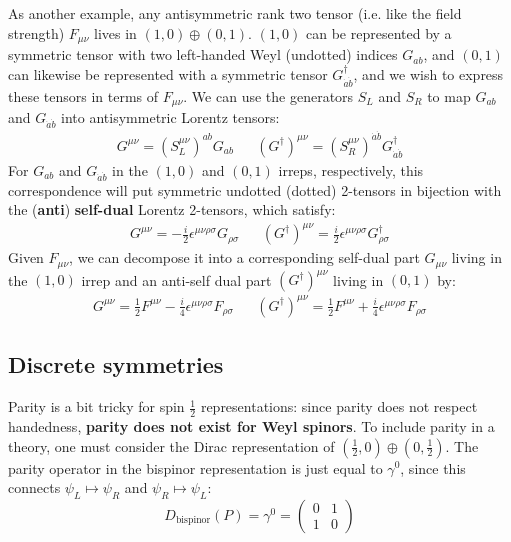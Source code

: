 \documentclass[11pt, oneside]{article}   	%
\theoremstyle{definition}
\begin{document}
As another example, any antisymmetric rank two tensor (i.e. like the field strength) $F_{\mu\nu}$ lives in $(1, 0)\oplus (0, 1)$. 
$(1, 0)$ can be represented by a symmetric tensor with two left-handed Weyl (undotted) indices $G_{ab}$, and $(0, 1)$ can likewise 
be represented with a symmetric tensor $G^\dagger_{\dot a \dot b}$, and we wish to express these tensors in terms of $F_{\mu\nu}$. 
We can use the generators $S_L$ and $S_R$ to map $G_{ab}$ and $G_{\dot a\dot b}$ into antisymmetric Lorentz tensors:
\begin{align}
	G^{\mu\nu} = (S_L^{\mu\nu})^{ab} G_{ab} && (G^\dagger)^{\mu\nu} = (S_R^{\mu\nu})^{\dot a \dot b} G^\dagger_{\dot a \dot b}
\end{align}
For $G_{ab}$ and $G_{\dot a\dot b}$ in the $(1, 0)$ and $(0, 1)$ irreps, respectively, this correspondence will put symmetric undotted (dotted)
2-tensors in bijection with the (\textbf{anti}) \textbf{self-dual} Lorentz 2-tensors, which satisfy:
\begin{align}
	G^{\mu\nu} = -\frac{i}{2}\epsilon^{\mu\nu\rho\sigma} G_{\rho\sigma} && (G^\dagger)^{\mu\nu} = \frac{i}{2}\epsilon^{\mu\nu\rho\sigma} 
	G_{\rho\sigma}^\dagger
\end{align}
Given $F_{\mu\nu}$, we can decompose it into a corresponding self-dual part $G_{\mu\nu}$ living in the $(1, 0)$ irrep and an anti-self 
dual part $(G^\dagger)^{\mu\nu}$ living in $(0, 1)$ by:
\begin{align}
	G^{\mu\nu} = \frac{1}{2} F^{\mu\nu} - \frac{i}{4}\epsilon^{\mu\nu\rho\sigma} F_{\rho\sigma} && 
	(G^\dagger)^{\mu\nu} = \frac{1}{2} F^{\mu\nu} + \frac{i}{4}\epsilon^{\mu\nu\rho\sigma} F_{\rho\sigma}
\end{align}
 
\subsection{Discrete symmetries}

Parity is a bit tricky for spin $\frac{1}{2}$ representations: since parity does not respect handedness, \textbf{parity does not exist for Weyl 
spinors}. To include parity in a theory, one must consider the Dirac representation of $(\frac{1}{2}, 0)\oplus (0, \frac{1}{2})$. 
The parity operator in the bispinor representation is just equal to $\gamma^0$, since this connects $\psi_L\mapsto \psi_R$ and 
$\psi_R\mapsto \psi_L$:
\begin{equation}
	D_\mathrm{bispinor}(P) = \gamma^0 = \begin{pmatrix} 0 & 1 \\ 1 & 0 \end{pmatrix}
\end{equation}
\end{document}
